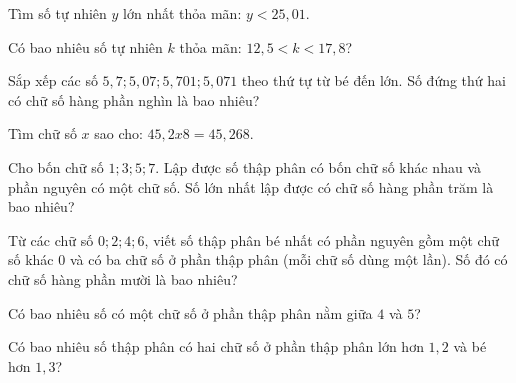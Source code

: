 \begin{ex}
  Tìm số tự nhiên $y$ lớn nhất thỏa mãn: $y < 25{,}01$.
\end{ex}

\begin{ex}
  Có bao nhiêu số tự nhiên $k$ thỏa mãn: $12{,}5 < k < 17{,}8$?
\end{ex}

\begin{ex}
  Sắp xếp các số $5{,}7; 5{,}07; 5{,}701; 5{,}071$ theo thứ tự từ bé đến lớn. Số đứng thứ hai có chữ số hàng phần nghìn là bao nhiêu?
\end{ex}

\begin{ex}
  Tìm chữ số $x$ sao cho: $45{,}2x8 = 45{,}268$.
\end{ex}

\begin{ex}
  Cho bốn chữ số $1; 3; 5; 7$. Lập được số thập phân có bốn chữ số khác nhau và phần nguyên có một chữ số. Số lớn nhất lập được có chữ số hàng phần trăm là bao nhiêu?
\end{ex}

\begin{ex}
  Từ các chữ số $0; 2; 4; 6$, viết số thập phân bé nhất có phần nguyên gồm một chữ số khác 0 và có ba chữ số ở phần thập phân (mỗi chữ số dùng một lần). Số đó có chữ số hàng phần mười là bao nhiêu?
\end{ex}

\begin{ex}
  Có bao nhiêu số có một chữ số ở phần thập phân nằm giữa $4$ và $5$?
\end{ex}

\begin{ex}
  Có bao nhiêu số thập phân có hai chữ số ở phần thập phân lớn hơn $1{,}2$ và bé hơn $1{,}3$?
\end{ex}

